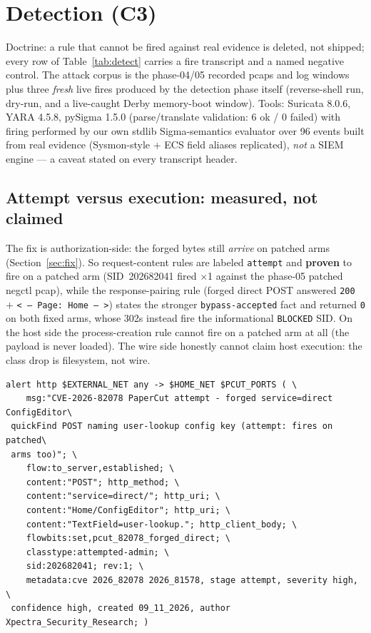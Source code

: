 \documentclass[journal]{IEEEtran}
\begin{document}
\section{Detection (C3)}
\label{sec:detection}
Doctrine: a rule that cannot be fired against real evidence is deleted, not
shipped; every row of Table~\ref{tab:detect} carries a fire transcript and a
named negative control. The attack corpus is the phase-04/05 recorded pcaps and
log windows plus three \emph{fresh} live fires produced by the detection phase
itself (reverse-shell run, dry-run, and a live-caught Derby memory-boot
window). Tools: Suricata 8.0.6, YARA 4.5.8, pySigma 1.5.0 (parse/translate
validation: 6 ok / 0 failed) with firing performed by our own stdlib Sigma-semantics
evaluator over 96 events built from real evidence (Sysmon-style + ECS field
aliases replicated), \emph{not} a SIEM engine — a caveat stated on every
transcript header.

\subsection{Attempt versus execution: measured, not claimed}
The fix is authorization-side: the forged bytes still \emph{arrive} on patched
arms (Section~\ref{sec:fix}). So request-content rules are labeled
\texttt{attempt} and \textbf{proven} to fire on a patched arm (SID~202682041
fired $\times$1 against the phase-05 patched negctl pcap), while the
response-pairing rule (forged direct POST answered \texttt{200} $+$
\texttt{<\,-- Page: Home --\,>}) states the stronger \texttt{bypass-accepted}
fact and returned \texttt{0} on both fixed arms, whose 302s instead fire the
informational \texttt{BLOCKED} SID. On the host side the process-creation rule
cannot fire on a patched arm at all (the payload is never loaded). The wire
side honestly cannot claim host execution: the class drop is filesystem, not
wire.

\begin{lstlisting}[style=shell, caption={Full attempt-level wire rule (SID
202682041) exactly as shipped in
\texttt{detection/rules/\allowbreak suricata/\allowbreak cve2026\_82078\_\allowbreak suricata.rules} (8.0.6
\texttt{-T} clean; \texttt{\$PCUT\_PORTS} etc. from the lab yaml — this
Suricata build rejects in-rule \texttt{var} declarations, measured). The
msg's parenthetical carries the honest scope: fires identically on patched
arms.}, label={lst:suricata}, xleftmargin=1.0em, xrightmargin=0.4em]
alert http $EXTERNAL_NET any -> $HOME_NET $PCUT_PORTS ( \
    msg:"CVE-2026-82078 PaperCut attempt - forged service=direct ConfigEditor\
 quickFind POST naming user-lookup config key (attempt: fires on patched\
 arms too)"; \
    flow:to_server,established; \
    content:"POST"; http_method; \
    content:"service=direct/"; http_uri; \
    content:"Home/ConfigEditor"; http_uri; \
    content:"TextField=user-lookup."; http_client_body; \
    flowbits:set,pcut_82078_forged_direct; \
    classtype:attempted-admin; \
    sid:202682041; rev:1; \
    metadata:cve 2026_82078 2026_81578, stage attempt, severity high, \
 confidence high, created 09_11_2026, author Xpectra_Security_Research; )
\end{lstlisting}
\end{document}
